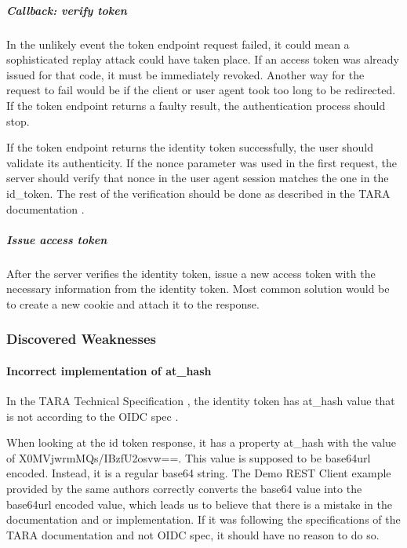 \subparagraph{Callback: verify token}

In the unlikely event the token endpoint request failed, it could mean a sophisticated replay attack could have taken place. If an access token was already issued for that code, it must be immediately revoked. Another way for the request to fail would be if the client or user agent took too long to be redirected. If the token endpoint returns a faulty result, the authentication process should stop.

If the token endpoint returns the identity token successfully, the user should validate its authenticity. If the nonce parameter was used in the first request, the server should verify that nonce in the user agent session matches the one in the id\_token. The rest of the verification should be done as described in the TARA documentation \cite{tara-technical}.


\subparagraph{Issue access token}

After the server verifies the identity token, issue a new access token with the necessary information from the identity token. Most common solution would be to create a new cookie and attach it to the response.


\subsubsection{Discovered Weaknesses}

\paragraph{Incorrect implementation of at\_hash}

In the TARA Technical Specification \cite{tara-technical}, the identity token has at\_hash value that is not according to the OIDC spec \cite{oidc}.

When looking at the id token response, it has a property at\_hash with the value of {X0MVjwrmMQs/IBzfU2osvw==}. This value is supposed to be base64url encoded. Instead, it is a regular base64 string. The Demo REST Client example provided by the same authors \cite{tara-demorest} correctly converts the base64 value into the base64url encoded value, which leads us to believe that there is a mistake in the documentation and or implementation. If it was following the specifications of the TARA documentation and not OIDC spec, it should have no reason to do so.

